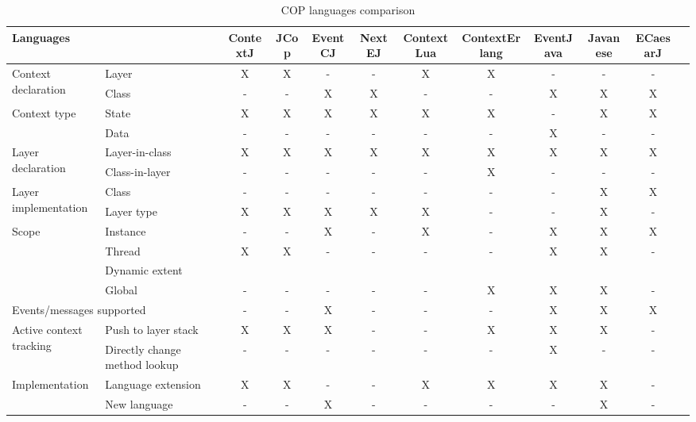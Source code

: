 \documentclass[a4paper]{article}
\begin{document}
\begin{landscape}
  \begin{table}
  \begin{adjustbox}{center}
  \begin{tabular}{l p{3cm} c c c c c c c c c c}
  \hline
  \multicolumn{2}{l}{Languages} & ContextJ & JCop & EventCJ & NextEJ & ContextLua & ContextErlang & EventJava & Javanese & ECaesarJ \\

  \hline
  \multirow{2}{*}{Context declaration}
    & Layer &   X & X & - & - & X & X & - & - & - \\
    & Class &   - & - & X & X & - & - & X & X & X \\
    
  \hline
  \multirow{2}{*}{Context type}
    & State &   X & X & X & X & X & X & - & X & X \\
    & Data  &   - & - & - & - & - & - & X & - & - \\    

  \hline  
  \multirow{2}{*}{Layer declaration}
    & Layer-in-class &   X & X & X & X & X & X & X & X & X \\
    & Class-in-layer &   - & - & - & - & - & X & - & - & - \\

  \hline
  \multirow{2}{*}{Layer implementation}
    & Class &       - & - & - & - & - & - & - & X & X \\
    & Layer type &  X & X & X & X & X & - & - & X & - \\    

  \hline  
  \multirow{3}{*}{Scope}
    & Instance &        - & - & X & - & X & - & X & X & X \\
    & Thread &          X & X & - & - & - & - & X & X & - \\
    & Dynamic extent &    &   &   &   &   &   &   &   &   \\
    & Global &          - & - & - & - & - & X & X & X & - \\

  \hline
  \multicolumn{2}{l}{Events/messages supported}
    & - & - & X & - & - & - & X & X & X \\

  \hline
  \multirow{2}{*}{Active context tracking}
    & Push to layer stack &             X & X & X & - & - & X & X & X & - \\
    & Directly change method lookup &   - & - & - & - & - & - & X & - & - \\

  \hline    
  \multirow{3}{*}{Implementation}
    & Language extension &   X & X & - & - & X & X & X & X & - \\
    & New language &         - & - & X & - & - & - & - & X & - \\

  \end{tabular}
  \end{adjustbox}
  \caption{COP languages comparison}
  \label{table:coplanguages}

  \end{table}
\end{landscape}
\end{document}
